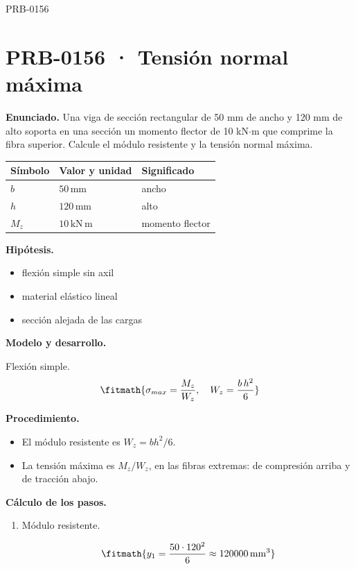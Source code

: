 \begin{studiumworked}{PRB-0156}

\section{PRB-0156 · Tensión normal máxima}

\textbf{Enunciado.} Una viga de sección rectangular de 50 mm de ancho y 120 mm de alto soporta en una sección un momento flector de 10 kN$\cdot$m que comprime la fibra superior. Calcule el módulo resistente y la tensión normal máxima.

\par\medskip\noindent\begin{tabular}{@{}p{.18\linewidth}p{.26\linewidth}p{.48\linewidth}@{}}
\toprule Símbolo & Valor y unidad & Significado\\\midrule
$b$ & $50\,\mathrm{mm}$ & ancho\\
$h$ & $120\,\mathrm{mm}$ & alto\\
$M_{z}$ & $10\,\mathrm{kN\,m}$ & momento flector\\
\bottomrule\end{tabular}\par\medskip

\textbf{Hipótesis.}\begin{itemize}\item flexión simple sin axil
\item material elástico lineal
\item sección alejada de las cargas\end{itemize}

\textbf{Modelo y desarrollo.}

Flexión simple.\[\fitmath{\sigma_{max} = \frac{M_z}{W_z},\quad W_z = \frac{b\,h^{2}}{6}}\]

\textbf{Procedimiento.}\begin{itemize}\item El módulo resistente es $W_z = b h^2/6$.
\item La tensión máxima es $M_z/W_z$, en las fibras extremas: de compresión arriba y de tracción abajo.\end{itemize}

\textbf{Cálculo de los pasos.}

\begin{enumerate}

\item Módulo resistente.

\[\fitmath{y_{1}=\frac{50\cdot {120}^{2}}{6}\approx 120000\,\mathrm{mm^{3}}}\]


\end{enumerate}
\end{studiumworked}
